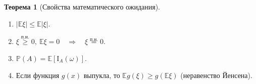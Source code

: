 \documentclass[oneside,final,14pt]{extreport}
\newcommand\myprob[1]{{\mathbb{P}(#1)}}
\theoremstyle{plain}
\theoremstyle{definition}
\theoremstyle{named}
\newtheorem*{namedthm}{Теорема}
\begin{document}
\begin{namedthm}[Свойства математического ожидания]
\begin{enumerate}
    {\bf Замечание.}
        Обратное неверно: из равенства $\mathbb{E}(\xi \eta) = \mathbb{E}\xi \mathbb{E} \eta$ {\it не следует} независимость величин $\xi$ и $\eta$.
    
    \item $|\mathbb{E}\xi| \leqslant \mathbb{E}|\xi|.$
    
    \item $\xi \overset{\text{п.н.}}{\geqslant} 0, \: \mathbb{E}\xi = 0 \quad \Rightarrow \quad \xi \overset{\text{п.н.}}{=} 0.$
    
    \item $\myprob{A} = \mathbb{E}\left[\mathrm{I}_A(\omega)\right].$
    
    \item Если функция $g(x)$ выпукла, то $\mathbb{E}g(\xi) \geqslant g(\mathbb{E}\xi)$ (неравенство Йенсена).
    
\end{enumerate}
\end{namedthm}
\end{document}
